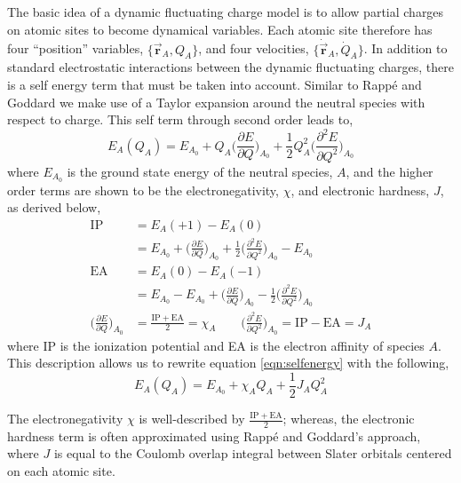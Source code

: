 The basic idea of a dynamic fluctuating charge model is to allow partial
charges on atomic sites to become dynamical variables.  Each atomic site
therefore has four ``position'' variables, $\{\vec{\mathbf{r}}_A, Q_A\}$, and
four velocities, $\{\dot{\vec{\mathbf{r}}}_A, \dot{Q}_A\}$.   In addition to
standard electrostatic interactions between the dynamic fluctuating charges,
there is a self energy term that must be taken into account. Similar to Rapp\'e
and Goddard\citep{Rappe:1991dq} we make use of a Taylor expansion around the
neutral species with respect to charge.  This self term through second order
leads to,
\begin{equation} \label{eqn:selfenergy}
E_A(Q_A) = E_{A_0} + Q_A\bigg( \frac{\partial E}{\partial Q} \bigg )_{A_0} +
\frac{1}{2}Q_A^2 \bigg(\frac{\partial^2E}{\partial Q^2}\bigg)_{A_0}
\end{equation}
where $E_{A_0}$ is the ground state energy of the neutral species, $A$, and the higher order terms
are shown to be the electronegativity, $\chi$, and electronic hardness, $J$, as derived below,
\begin{align*}
\mathrm{IP} &= E_A(+1) - E_A(0) \\
& = E_{A_0} + \bigg (\frac{\partial E}{\partial Q}\bigg)_{A_0} + \frac{1}{2}\bigg(\frac{\partial^2E}{\partial Q^2}\bigg)_{A_0} - E_{A_0} \\
\mathrm{EA} &= E_A(0) - E_A(-1) \\
& = E_{A_0} - E_{A_0} + \bigg (\frac{\partial E}{\partial Q}\bigg)_{A_0} - \frac{1}{2}\bigg(\frac{\partial^2E}{\partial Q^2}\bigg)_{A_0}  \\
\bigg (\frac{\partial E}{\partial Q}\bigg)_{A_0} &= \frac{\mathrm{IP+EA}}{2} = \chi_A \qquad \bigg (\frac{\partial^2 E}{\partial Q^2}\bigg)_{A_0} = \mathrm{IP-EA} = J_A
\end{align*}
where IP is the ionization potential and EA is the electron affinity of species $A$.  This
description allows us to rewrite equation \ref{eqn:selfenergy} with the following,
\begin{equation}
E_A(Q_A) = E_{A_0} + \chi_A Q_A + \frac{1}{2} J_{A} Q_A^2
\end{equation}


The electronegativity $\chi$ is well-described by
$\frac{\mathrm{IP+EA}}{2}$; whereas, the electronic hardness term is often approximated using
Rapp\'e and Goddard's approach, where $J$ is equal to the
Coulomb overlap integral between Slater orbitals centered on each
atomic site\citep{Rappe:1991dq}.

